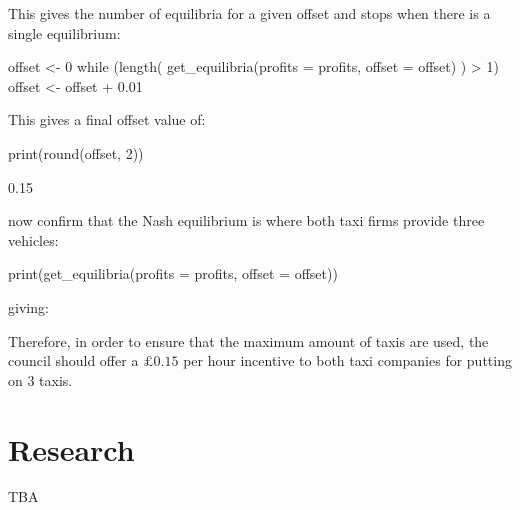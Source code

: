 This gives the number of equilibria for a given offset and stops when there is a
single equilibrium:

\begin{Rin}
offset <- 0
while (length(
            get_equilibria(profits = profits, offset = offset)
            ) > 1){
    offset <- offset + 0.01
}
\end{Rin}

This gives a final offset value of:

\begin{Rin}
print(round(offset, 2))
\end{Rin}

\begin{Rout}
[1] 0.15
\end{Rout}

now confirm that the Nash equilibrium is where both taxi firms provide
three vehicles:

\begin{Rin}
print(get_equilibria(profits = profits, offset = offset))
\end{Rin}

giving:


Therefore, in order to ensure that the maximum amount of taxis are used, the
council should offer a \(\pounds 0.15\) per hour incentive to both taxi
companies for putting on 3 taxis.

\section{Research}\label{sec:research}

TBA

